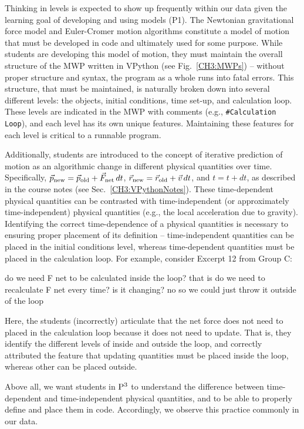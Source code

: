 \documentclass{msuphddissertation}
\begin{document}
\begin{doublespace}
Thinking in levels is expected to show up frequently within our data given the learning goal of developing and using models (P1).  The Newtonian gravitational force model and Euler-Cromer motion algorithms constitute a model of motion that must be developed in code and ultimately used for some purpose.  While students are developing this model of motion, they must maintain the overall structure of the MWP written in VPython (see Fig.~\ref{CH3:MWPs}) -- without proper structure and syntax, the program as a whole runs into fatal errors.  This structure, that must be maintained, is naturally broken down into several different levels: the objects, initial conditions, time set-up, and calculation loop.  These levels are indicated in the MWP with comments (e.g., \texttt{\#Calculation Loop}), and each level has its own unique features.  Maintaining these features for each level is critical to a runnable program.

Additionally, students are introduced to the concept of iterative prediction of motion as an algorithmic change in different physical quantities over time.  Specifically, $\vec{p}_{\rm new} = \vec{p}_{\rm old} + \vec{F}_{\rm net}\,dt$, $\vec{r}_{\rm new} = \vec{r}_{\rm old} + \vec{v}\,dt$, and $t = t + dt$, as described in the course notes (see Sec.~\ref{CH3:VPythonNotes}).  These time-dependent physical quantities can be contrasted with time-independent (or approximately time-independent) physical quantities (e.g., the local acceleration due to gravity).  Identifying the correct time-dependence of a physical quantities is necessary to ensuring proper placement of its definition -- time-independent quantities can be placed in the initial conditions level, whereas time-dependent quantities must be placed in the calculation loop.  For example, consider Excerpt 12 from Group C:  \begin{description}
\SA do we need F net to be calculated inside the loop?
\SA that is do we need to recalculate F net every time? is it changing?
\SB no	
\SA so we could just throw it outside of the loop\end{description}  Here, the students (incorrectly) articulate that the net force does not need to placed in the calculation loop because it does not need to update.  That is, they identify the different levels of inside and outside the loop, and correctly attributed the feature that updating quantities must be placed inside the loop, whereas other can be placed outside.

Above all, we want students in ${\rm P}^{3}$ to understand the difference between time-dependent and time-independent physical quantities, and to be able to properly define and place them in code.  Accordingly, we observe this practice commonly in our data.


\end{doublespace}
\end{document}
